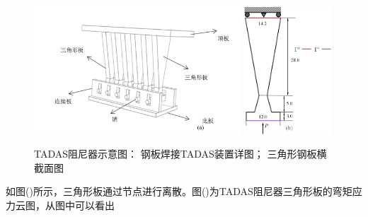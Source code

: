 \begin{figure}[H]
    \centering
    \begin{subcaptiongroup}
            \includegraphics[width=0.69\textwidth]{figure/TADAS/2.png}
            \label{TADAS2}
            \includegraphics[width=0.29\textwidth]{figure/TADAS/3.png}
            \label{TADAS3}
            \end{subcaptiongroup}
        \caption{TADAS阻尼器示意图： 钢板焊接TADAS装置详图； 三角形钢板横截面图}
    \label{TADAS2}
\end{figure}
如图()所示，三角形板通过节点进行离散。图()为TADAS阻尼器三角形板的弯矩应力云图，从图中可以看出


